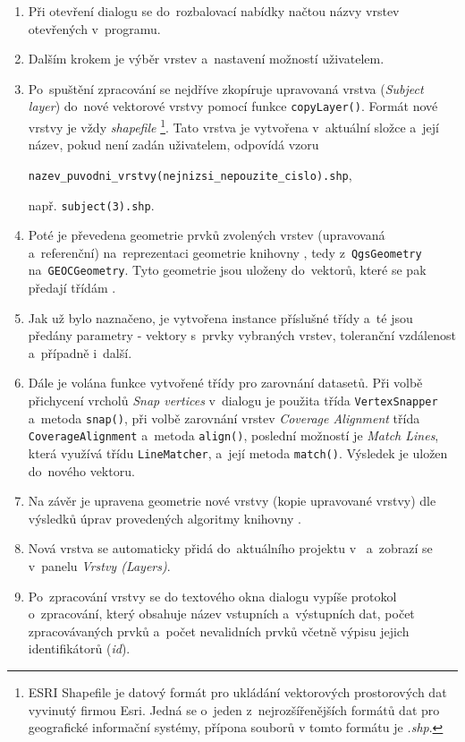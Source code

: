 \begin{enumerate}
 \item Při otevření dialogu se do~rozbalovací nabídky načtou názvy vrstev 
	otevřených v~programu.
 \item Dalším krokem je výběr vrstev a~nastavení možností uživatelem.
 \item Po~spuštění zpracování se nejdříve zkopíruje upravovaná vrstva 
	(\textit{Subject layer}) do~nové vektorové vrstvy pomocí funkce 
	\texttt{copyLayer()}. Formát nové vrstvy je vždy \textit{shapefile}
	\footnote{ESRI Shapefile je datový formát pro ukládání vektorových 
	  prostorových dat  vyvinutý firmou Esri. Jedná se o~jeden 
	  z~nejrozšířenějších formátů dat pro geografické informační systémy,
	  přípona souborů v tomto formátu je \textit{.shp}.}.
	Tato vrstva je vytvořena v~aktuální složce a~její název, pokud není
	zadán uživatelem, odpovídá vzoru
	\begin{center}
	 \texttt{nazev\_puvodni\_vrstvy(nejnizsi\_nepouzite\_cislo).shp},
	\end{center}
	např. \texttt{subject(3).shp}.
 \item Poté je převedena geometrie prvků zvolených vrstev (upravovaná
	a~referenční) na~reprezentaci geometrie knihovny ,
	tedy z~\texttt{Qgs\-Geo\-metry} na~\texttt{GEOC\-Geo\-metry}. 
	Tyto geometrie 	jsou uloženy do~vektorů, které se pak předají 
	třídám .
 \item Jak už bylo naznačeno, je vytvořena instance příslušné třídy 
	 a~té jsou předány parametry - vektory s~prvky vybraných
	vrstev, toleranční vzdálenost a~případně i~další. 
 \item Dále je volána funkce vytvořené třídy pro zarovnání datasetů. Při volbě 
	při\-chycení vrcholů \textit{Snap vertices} v~dialogu je použita třída 
	\texttt{Vertex\-Snapper} a~metoda \texttt{snap()}, při volbě zarovnání 
	vrstev \textit{Coverage Alignment} třída \texttt{Cove\-rage\-Align\-ment} 
	a~metoda \texttt{align()}, poslední možností je \textit{Match Lines}, která
	využívá třídu \texttt{Line\-Matcher}, a~její metoda \texttt{match()}. 
	Výsledek je uložen do~nového vektoru.
 \item Na závěr je upravena geometrie nové vrstvy (kopie upravované vrstvy) dle
	vý\-sledků úprav provedených algoritmy knihovny .
 \item Nová vrstva se automaticky přidá do~aktuálního projektu v~ 
	a~zobrazí se v~panelu \textit{Vrstvy (Layers)}.
 \item Po~zpracování vrstvy se do textového okna dialogu vypíše protokol 
	o~zpracování, který obsahuje název vstupních a~výstupních dat, počet
	zpracovávaných prvků a~počet nevalidních prvků včetně výpisu jejich
	identifikátorů (\textit{id}).
\end{enumerate}





 

